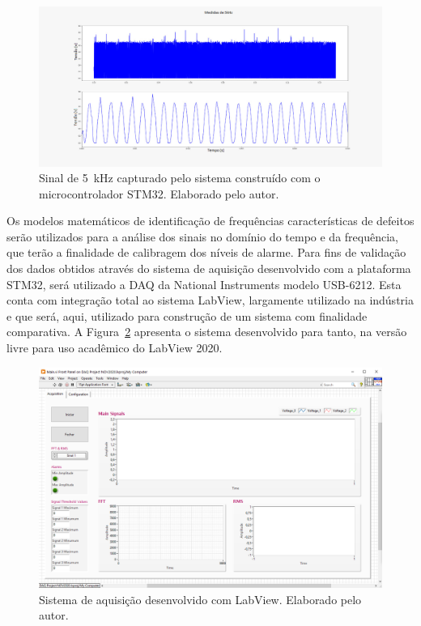\documentclass[
	12pt,				
	oneside,			
	a4paper,			
	english,			
	brazil,			
	]{abntex2ppgsi}
\begin{document}
\begin{figure}[H]
\centering
\includegraphics[width=\textwidth,height=\textheight,keepaspectratio]{medidas_sistema_aquisicao_stm32}
\caption {Sinal de \SI{5}{\kilo\hertz} capturado pelo sistema construído com o microcontrolador STM32. Elaborado pelo autor.}
\label{medidas_sistema_aquisicao_stm32}
\end{figure} 

Os modelos matemáticos de identificação de frequências características de defeitos serão utilizados para a análise dos sinais no domínio do tempo e da frequência, que terão a finalidade de calibragem dos níveis de alarme. Para fins de validação dos dados obtidos através do sistema de aquisição desenvolvido com a plataforma STM32, será utilizado a DAQ da National Instruments modelo USB-6212. Esta conta com integração total ao sistema LabView, largamente utilizado na indústria e que será, aqui, utilizado para construção de um sistema com finalidade comparativa. A Figura~\ref{sistema_labview} apresenta o sistema desenvolvido para tanto, na versão livre para uso acadêmico do LabView 2020.

\begin{figure}[H]
\centering
\includegraphics[width=\textwidth,height=\textheight,keepaspectratio]{sistema_labview}
\caption {Sistema de aquisição desenvolvido com LabView. Elaborado pelo autor.}
\label{sistema_labview}
\end{figure} 
\end{document}
